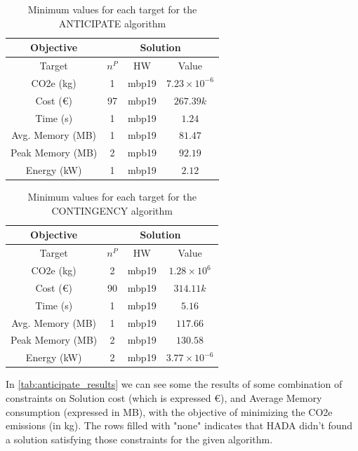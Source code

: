 \documentclass[a4paper,singleside,12pt]{report} %
\begin{document}
\begin{table}[h!]
    \centering
    \begin{tabular}{|c|ccc|}
        \hline
        \multicolumn{1}{|c|}{Objective} & \multicolumn{3}{c|}{Solution} \\
        \hline
        Target & $n^P$ & HW & Value \\
        \hline
        CO2e (kg) & 1 & mbp19 & $7.23 \times 10^{-6}$ \\
        Cost (€) & 97 & mbp19 & $267.39k$ \\
        Time (s)& 1 & mbp19 & $1.24$ \\
        Avg. Memory (MB) & 1 & mbp19 & $81.47$ \\
        Peak Memory (MB) & 2 & mpb19 & $92.19$ \\
        Energy (kW) & 1 & mbp19 & $2.12$ \\
        \hline
    \end{tabular}
    \caption{Minimum values for each target for the ANTICIPATE algorithm}
    \label{tab:anticipate_min_targets}
\end{table}


\begin{table}[h!]
    \centering
    \begin{tabular}{|c|ccc|}
        \hline
        \multicolumn{1}{|c|}{Objective} & \multicolumn{3}{c|}{Solution} \\
        \hline
        Target & $n^P$ & HW & Value \\
        \hline
        CO2e (kg) & 2 & mbp19 & $1.28 \times 10^{6}$ \\
        Cost (€) & 90 & mbp19 & $314.11k$ \\
        Time (s)& 1 & mbp19 & $5.16$ \\
        Avg. Memory (MB) & 1 & mbp19 & $117.66$ \\
        Peak Memory (MB) & 2 & mbp19 & $130.58$ \\
        Energy (kW) & 2 & mbp19 & $3.77 \times 10^{-6}$ \\
        \hline
    \end{tabular}
    \caption{Minimum values for each target for the CONTINGENCY algorithm}
    \label{tab:contingency_min_targets}
\end{table}

In \ref{tab:anticipate_results} we can see some the results of some combination of constraints on Solution cost (which is
expressed €), and Average Memory consumption (expressed in MB), with the objective of minimizing the CO2e 
emissions (in kg). The rows filled with "none" indicates that HADA didn't found a solution satisfying those constraints for the
given algorithm.
\end{document}
